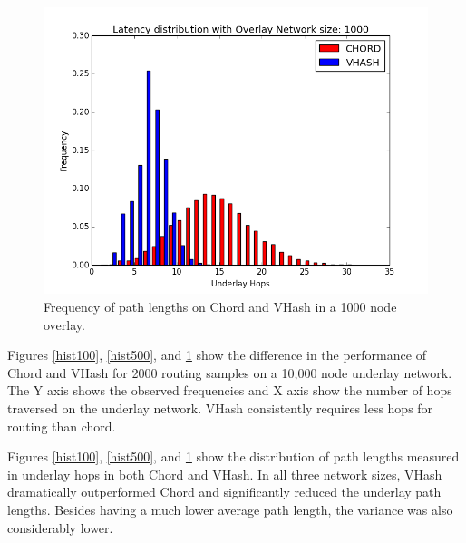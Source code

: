 \documentclass[10pt, conference, letterpaper]{IEEEtran}
\begin{document}
{\begin{figure}
	\centering
	\includegraphics[width=\linewidth]{hist_1000}
	\caption{Frequency of path lengths on Chord and VHash in a 1000 node overlay.}
	\label{hist1000}
\end{figure}

Figures \ref{hist100}, \ref{hist500}, and \ref{hist1000} show the difference in the performance of Chord and VHash for 2000 routing samples on a 10,000 node underlay network. 
The Y axis shows the observed frequencies and X axis show the number of hops traversed on the underlay network.
VHash consistently requires less hops for routing than chord.


}



Figures \ref{hist100}, \ref{hist500}, and \ref{hist1000} show the distribution of path lengths measured in underlay hops in both Chord and VHash.   
In all three network sizes, VHash dramatically outperformed Chord and significantly reduced the underlay path lengths.  
Besides having a much lower average path length, the variance was also considerably lower.
\end{document}
